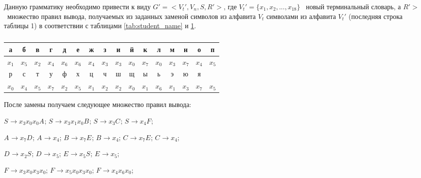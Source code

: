 \documentclass[a4paper,14pt,russian]{extarticle} %
\begin{document}
Данную грамматику необходимо привести к виду \(G' = <V_t', V_n, S, R'>\), где \(V_t' = \{ x_1, x_2, ... ,x_{18} \} \) \textendash\ новый терминальный словарь, а \(R'>\) \textendash\ множество правил вывода, получаемых из заданных заменой символов из алфавита \(V_t\) символами из алфавита \(V_t'\) (последняя строка таблицы 1) в соответствии с таблицами \ref{tab:student_name} и \ref{tab:russian_alphabet}. 

\begin{table}[H]
	\centering	
	\begin{threeparttable}
	\renewcommand{\arraystretch}{0.85}
	\renewcommand{\tabcolsep}{0.4em}	 
	\caption{}	
	\label{tab:russian_alphabet}
		\begin{tabular}{|c|c|c|c|c|c|c|c|c|c|c|c|c|c|c|c|}
			\hline
			а & б & в & г & д & е & ж & з & и & й & к & л & м & н & о & п \\ \hline
			\({x_{1}}\) & \({x_{5}}\) & \({x_{2}}\) & \({x_{4}}\) & \({x_{6}}\) & \({x_{6}}\) & \({x_{4}}\) & \({x_{3}}\) & \({x_{3}}\) & \({x_{0}}\) & \({x_{7}}\) & \({x_{0}}\) & \({x_{3}}\) & \({x_{7}}\) & \({x_{4}}\) & \({x_{5}}\) \\ \hline
			р & с & т & у & ф & х & ц & ч & ш & щ & ы & ь & э & ю & я &   \\ \hline
			\({x_{0}}\) & \({x_{4}}\) & \({x_{5}}\) & \({x_{7}}\) & \({x_{2}}\) & \({x_{5}}\) & \({x_{1}}\) & \({x_{2}}\) & \({x_{2}}\) & \({x_{0}}\) & \({x_{1}}\) & \({x_{6}}\) & \({x_{1}}\) & \({x_{3}}\) & \({x_{7}}\) & \({x_{5}}\) \\ \hline
		\end{tabular}	
	\end{threeparttable}	
\end{table}

После замены получаем следующее множество правил вывода:
\begin{center}
	\({S_{}}\rightarrow{{x_{3}}{x_{0}}{x_{0}} {A_{}}}\);
	\({S_{}}\rightarrow{{x_{3}}{x_{1}}{x_{0}} {B_{}}}\);
	\({S_{}}\rightarrow{{x_{3}} {C_{}}}\);
	\({S_{}}\rightarrow{{x_{4}} {F_{}}}\);
	
	\({A_{}}\rightarrow{{x_{7}} {D_{}}}\);
	\({A_{}}\rightarrow{{x_{4}}}\);
	\({B_{}}\rightarrow{{x_{7}} {E_{}}}\);
	\({B_{}}\rightarrow{{x_{4}}}\);
	\({C_{}}\rightarrow{{x_{7}} {E_{}}}\);
	\({C_{}}\rightarrow{{x_{4}}}\);
	
	\({D_{}}\rightarrow{{x_{2}} {S_{}}}\);
	\({D_{}}\rightarrow{{x_{5}}}\);
	\({E_{}}\rightarrow{{x_{5}} {S_{}}}\);
	\({E_{}}\rightarrow{{x_{5}}}\);
	
	\({F_{}}\rightarrow{{x_{3}}{x_{0}}{x_{3}}{x_{0}}}\);
	\({F_{}}\rightarrow{{x_{5}}{x_{0}}{x_{3}}{x_{0}}}\);
	\({F_{}}\rightarrow{{x_{4}}{x_{6}}{x_{0}}}\);
\end{center}
\end{document}
